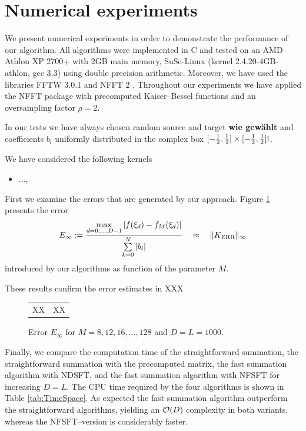 \documentclass[11pt,a4paper,twoside,bibtotoc]{scrartcl}
\theoremstyle{plain}
\theoremstyle{definition}
\theoremstyle{remark}
\newcommand{\fun}[2]{\ensuremath{#1{\hspace{-0.4ex}}\left(#2\right)}}
\numberwithin{equation}{section}
\numberwithin{table}{section}
\numberwithin{figure}{section}
\begin{document}
\section{Numerical experiments}

We present numerical experiments in order to demonstrate the performance of
our algorithm.
All algorithms were implemented in C and tested on an AMD Athlon\texttrademark
XP 2700+ with 2GB main memory, SuSe-Linux (kernel 2.4.20-4GB-athlon, gcc 3.3)
using double precision arithmetic. 
Moreover, we have used the libraries FFTW 3.0.1 \cite{fftw} and NFFT 2
\cite{kupo02C}. 
Throughout our experiments we have applied the NFFT package \cite{kupo02C}
with precomputed Kaiser--Bessel functions and an oversampling factor $\rho=2$.

In our tests we have always chosen random source and target {\bf wie gewählt}
and coefficients $b_l$ uniformly distributed in the complex box
$[-\frac{1}{2},\frac{1}{2}]\times [-\frac{1}{2},\frac{1}{2}]{\rm i}$.

We have considered the following kernels

\begin{itemize}
\item ...,
\end{itemize}


First we examine the errors that are generated by our approach.
Figure \ref{fig:error} presents the error
\[
E_{\infty}:=
 \frac{\max\limits_{d=0,\ldots,D-1}\left|\fun{f}{\xi_{d}}-
 \fun{f_{M}}{\xi_{d}}\right|}{\sum\limits_{k=0}^N 
 |b_l|} \quad \approx \quad \|K_{\text{ERR}}\|_{\infty}
\]
introduced by our algorithms as function of the parameter $M$.

These results confirm the error estimates in XXX

\begin{figure}[ht]
  \centering
  \begin{tabular}[h]{cc}
    XX & XX
  \end{tabular}
  \caption[fig:Time]{Error $E_{\infty}$ for $M=8,12,16,\hdots,128$ and $D=L=1000$.
    \label{fig:error}}
\end{figure}

Finally, we compare the computation time of the straightforward summation, the
straightforward summation with the precomputed matrix, the fast summation
algorithm with NDSFT, and the fast summation algorithm with NFSFT for
increasing $D=L$. 
The CPU time required by the four algorithms is shown in Table
\ref{tab:TimeSpace}. 
As expected the fast summation algorithm outperform the straightforward
algorithms, yielding an ${\cal O}(D)$ complexity in both variants, whereas the
NFSFT--version is considerably faster.
\end{document}
